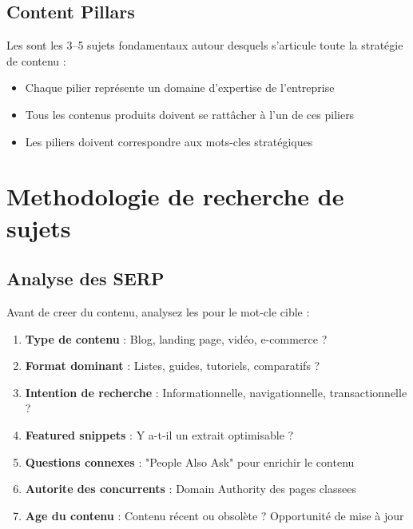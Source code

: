 
\subsection{Content Pillars}

Les  sont les 3--5 sujets fondamentaux autour desquels s'articule toute la stratégie de contenu :

\begin{itemize}
    \item Chaque pilier représente un domaine d'expertise de l'entreprise
    \item Tous les contenus produits doivent se rattâcher à l'un de ces piliers
    \item Les piliers doivent correspondre aux mots-cles stratégiques
\end{itemize}

\section{Methodologie de recherche de sujets}

\subsection{Analyse des SERP}

Avant de creer du contenu, analysez les  pour le mot-cle cible :

\begin{enumerate}
    \item \textbf{Type de contenu} : Blog, landing page, vidéo, e-commerce ?
    \item \textbf{Format dominant} : Listes, guides, tutoriels, comparatifs ?
    \item \textbf{Intention de recherche} : Informationnelle, navigationnelle, transactionnelle ?
    \item \textbf{Featured snippets} : Y a-t-il un extrait optimisable ?
    \item \textbf{Questions connexes} : "People Also Ask" pour enrichir le contenu
    \item \textbf{Autorite des concurrents} : Domain Authority des pages classees
    \item \textbf{Age du contenu} : Contenu récent ou obsolète ? Opportunité de mise à jour
\end{enumerate}

